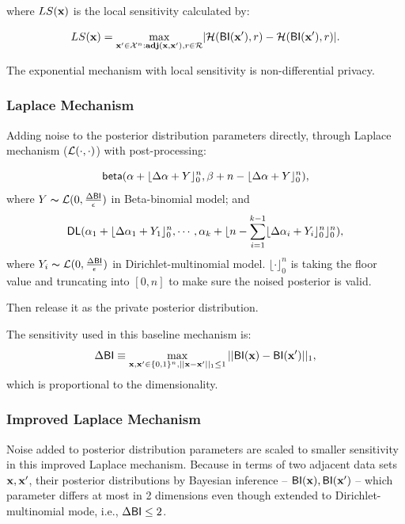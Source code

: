 \documentclass{article}
\begin{document}
where $LS(\textbf{x})$ is the local sensitivity calculated by:

\begin{equation*}
LS(\textbf{x})=\max_{\textbf{x}' \in \mathcal{X}^n:\textbf{adj}(\textbf{x},\textbf{x}'), r\in \mathcal{R}}\lvert \mathcal{H}(\mathsf{BI}(\textbf{x}'), r) - \mathcal{H}(\mathsf{BI}(\textbf{x}'), r)\rvert.
\end{equation*}

The exponential mechanism with local sensitivity is non-differential privacy\cite{dwork2014algorithmic}.



\subsubsection{Laplace Mechanism}
 Adding noise to the posterior distribution parameters directly, through Laplace mechanism ($\mathcal{L}(\cdot, \cdot)$) with post-processing:

 \[
 \mathsf{beta}(\alpha +  \lfloor{\Delta \alpha + Y}\rfloor^n_0,\beta + n - \lfloor{\Delta \alpha + Y}\rfloor^n_0),
 \] 
 where $Y \thicksim \mathcal{L}(0, \frac{\Delta \mathsf{BI}}{\epsilon})$ in Beta-binomial model; and
 \[
 \mathsf{DL}(\alpha_1 +  \lfloor{\Delta \alpha_1 + Y_1}\rfloor^n_0, \cdots, \alpha_k + \lfloor n - \sum_{i = 1}^{k-1}\lfloor{\Delta \alpha_i + Y_i}\rfloor^n_0 \rfloor^n_0),
 \]
 where $Y_i \thicksim \mathcal{L}(0, \frac{\Delta \mathsf{BI}}{\epsilon})$ in Dirichlet-multinomial model. $\lfloor \cdot \rfloor^n_0$ is taking the floor value and truncating into $[0,n]$ to make sure the noised posterior is valid.

 Then release it as the private posterior distribution.

 The sensitivity used in this baseline mechanism is:
 \[
 \Delta \mathsf{BI} \equiv \max\limits_{\textbf{x}, \textbf{x}' \in \{0,1\}^{n}, ||\textbf{x} - \textbf{x}'||_1 \leq 1} ||\mathsf{BI}(\textbf{x}) - \mathsf{BI}(\textbf{x}')||_1,
 \]
 which is proportional to the dimensionality.


\subsubsection{Improved Laplace Mechanism}

 Noise added to posterior distribution parameters are scaled to smaller sensitivity in this improved Laplace mechanism. Because in terms of two adjacent data sets $\textbf{x}, \textbf{x}'$, their posterior distributions by Bayesian inference -- $\mathsf{BI}(\textbf{x}), \mathsf{BI}(\textbf{x}')$ -- which parameter differs at most in 2 dimensions even though extended to Dirichlet-multinomial mode, i.e., $\Delta \mathsf{BI} \leq 2$. 
\end{document}
